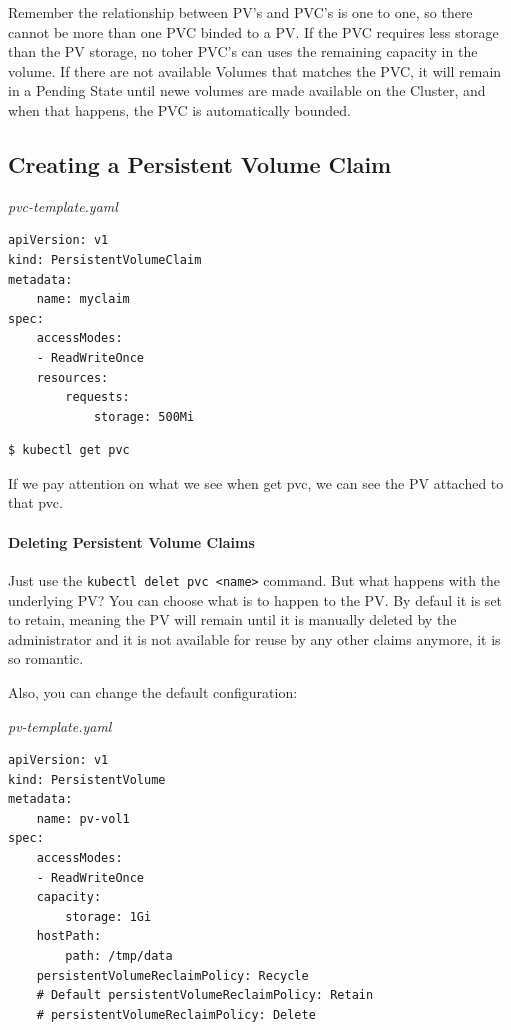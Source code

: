 \documentclass{article}
\newenvironment{blocktemplate}[1]{%
    \tcolorbox[beamer,%
    noparskip,breakable,
    colframe=Blue,%
    colbacklower=LimeGreen!75!LightGreen,%
    title=#1]}%
    {\endtcolorbox}
\newenvironment{blocktemplateIII}[1]{%
    \tcolorbox[beamer,%
    noparskip,breakable,
    ,colframe=Red,%
    colbacklower=LimeGreen!75!LightGreen,%
    title=#1]}%
    {\endtcolorbox}
\newenvironment{codetemplate}[1][]{%
  \mybasecolorbox[#1]
  \itshape
}{%
  \endmybasecolorbox
}
\begin{document}
\begin{blocktemplateIII}{WARNING}
Remember the relationship between PV's and PVC's is one to one, so there cannot be more than one PVC binded to a PV. If the PVC requires less storage than the PV storage, no toher PVC's can uses the remaining capacity in the volume. If there are not available Volumes that matches the PVC, it will remain in a Pending State until newe volumes are made available on the Cluster, and when that happens, the PVC is automatically bounded.
\end{blocktemplateIII}

\subsection{Creating a Persistent Volume Claim}

\begin{codetemplate}{pvc-template.yaml}
\begin{verbatim}
apiVersion: v1
kind: PersistentVolumeClaim
metadata:
    name: myclaim
spec:
    accessModes:
    - ReadWriteOnce
    resources:
        requests:
            storage: 500Mi
\end{verbatim}
\end{codetemplate}

\begin{codetemplate}{}
\begin{verbatim}
$ kubectl get pvc
\end{verbatim}
\end{codetemplate}

\begin{blocktemplate}{NOTE}
If we pay attention on what we see when get pvc, we can see the PV attached to that pvc.
\end{blocktemplate}

\paragraph{Deleting Persistent Volume Claims}

Just use the  \verb|kubectl delet pvc <name>| command. But what happens with the underlying PV? You can choose what is to happen to the PV. By defaul it is set to retain, meaning the PV will remain until it is manually deleted by the administrator and it is not available for reuse by any other claims anymore, it is so romantic.

Also, you can change the default configuration:

\begin{codetemplate}{pv-template.yaml}
\begin{verbatim}
apiVersion: v1
kind: PersistentVolume
metadata:
    name: pv-vol1
spec:
    accessModes:
    - ReadWriteOnce
    capacity:
        storage: 1Gi
    hostPath:
        path: /tmp/data
    persistentVolumeReclaimPolicy: Recycle
    # Default persistentVolumeReclaimPolicy: Retain
    # persistentVolumeReclaimPolicy: Delete
\end{verbatim}
\end{codetemplate}
\end{document}
